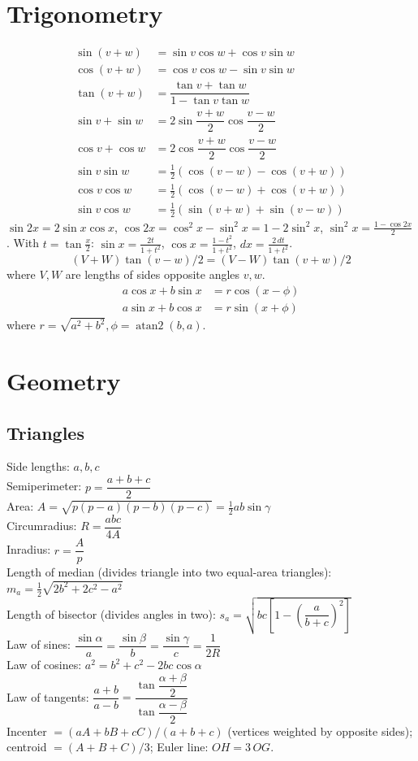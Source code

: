 \section{Trigonometry}
\begin{align*}
\sin(v+w)&{}=\sin v\cos w+\cos v\sin w\\
\cos(v+w)&{}=\cos v\cos w-\sin v\sin w\\
\tan(v+w)&{}=\dfrac{\tan v+\tan w}{1-\tan v\tan w}\\
\sin v+\sin w&{}=2\sin\dfrac{v+w}{2}\cos\dfrac{v-w}{2}\\
\cos v+\cos w&{}=2\cos\dfrac{v+w}{2}\cos\dfrac{v-w}{2}\\
\sin v \sin w &{}= \tfrac12(\cos(v-w) - \cos(v+w))\\
\cos v \cos w &{}= \tfrac12(\cos(v-w) + \cos(v+w))\\
\sin v \cos w &{}= \tfrac12(\sin(v+w) + \sin(v-w))
\end{align*}
$\sin 2x = 2\sin x\cos x$, $\cos 2x = \cos^2x - \sin^2x = 1 - 2\sin^2 x$,
$\sin^2 x = \frac{1-\cos 2x}2$. With $t = \tan\frac x2$: $\sin x = \frac{2t}{1+t^2}$,
$\cos x = \frac{1-t^2}{1+t^2}$, $dx = \frac{2\,dt}{1+t^2}$.
\[ (V+W)\tan(v-w)/2{}=(V-W)\tan(v+w)/2 \]
where $V, W$ are lengths of sides opposite angles $v, w$.
\begin{align*}
	a\cos x+b\sin x&=r\cos(x-\phi)\\
	a\sin x+b\cos x&=r\sin(x+\phi)
\end{align*}
where $r=\sqrt{a^2+b^2}, \phi=\operatorname{atan2}(b,a)$.

\section{Geometry}

\subsection{Triangles}
Side lengths: $a,b,c$\\
Semiperimeter: $p=\dfrac{a+b+c}{2}$\\
Area: $A=\sqrt{p(p-a)(p-b)(p-c)} = \frac12 ab\sin\gamma$\\
Circumradius: $R=\dfrac{abc}{4A}$\\
Inradius: $r=\dfrac{A}{p}$\\
Length of median (divides triangle into two equal-area triangles): $m_a=\tfrac{1}{2}\sqrt{2b^2+2c^2-a^2}$\\
Length of bisector (divides angles in two): $s_a=\sqrt{bc\left[1-\left(\dfrac{a}{b+c}\right)^2\right]}$\\
Law of sines: $\dfrac{\sin\alpha}{a}=\dfrac{\sin\beta}{b}=\dfrac{\sin\gamma}{c}=\dfrac{1}{2R}$\\
Law of cosines: $a^2=b^2+c^2-2bc\cos\alpha$\\
Law of tangents: $\dfrac{a+b}{a-b}=\dfrac{\tan\dfrac{\alpha+\beta}{2}}{\tan\dfrac{\alpha-\beta}{2}}$\\
Incenter $= (aA + bB + cC)/(a+b+c)$ (vertices weighted by opposite sides);
centroid $= (A+B+C)/3$; Euler line: $OH = 3\,OG$.

